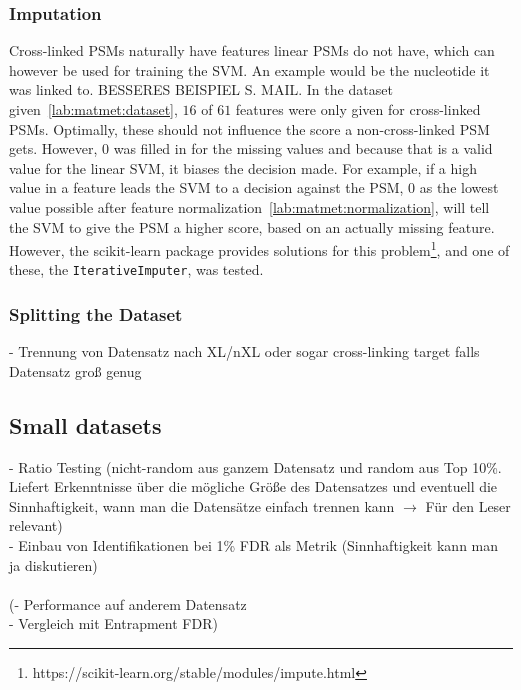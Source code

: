 \subsubsection{Imputation}
\label{lab:matmet:imputation}
Cross-linked PSMs naturally have features linear PSMs do not have, which can however be used for training the SVM. An example would be the nucleotide it was linked to. BESSERES BEISPIEL S. MAIL. In the dataset given~\ref{lab:matmet:dataset}, $16$ of $61$ features were only given for cross-linked PSMs. Optimally, these should not influence the score a non-cross-linked PSM gets. However, $0$ was filled in for the missing values and because that is a valid value for the linear SVM, it biases the decision made. For example, if a high value in a feature leads the SVM to a decision against the PSM, $0$ as the lowest value possible after feature normalization~\ref{lab:matmet:normalization}, will tell the SVM to give the PSM a higher score, based on an actually missing feature.
However, the scikit-learn package provides solutions for this problem\footnote{https://scikit-learn.org/stable/modules/impute.html}, and one of these, the \texttt{IterativeImputer}, was tested. %
\subsubsection{Splitting the Dataset}
\label{lab:matmet:splitting}
- Trennung von Datensatz nach XL/nXL oder sogar cross-linking target falls Datensatz groß genug\\
\subsection{Small datasets}
- Ratio Testing (nicht-random aus ganzem Datensatz und random aus Top 10\%. Liefert Erkenntnisse über die mögliche Größe des Datensatzes und eventuell die Sinnhaftigkeit, wann man die Datensätze einfach trennen kann $\rightarrow$ Für den Leser relevant)\\
- Einbau von Identifikationen bei 1\% FDR als Metrik (Sinnhaftigkeit kann man ja diskutieren)\\\\			
(- Performance auf anderem Datensatz\\
- Vergleich mit Entrapment FDR)

